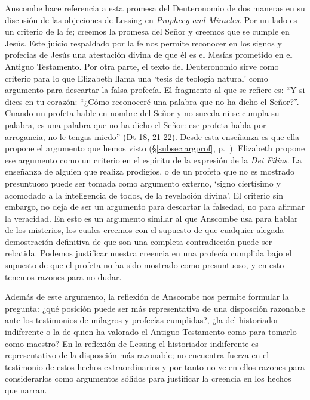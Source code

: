 Anscombe hace referencia a esta promesa del Deuteronomio de dos maneras en su discusión de las objeciones de Lessing en \emph{Prophecy and Miracles}. Por un lado es un criterio de la fe; creemos la promesa del Señor y creemos que se cumple en Jesús. Este juicio respaldado por la fe nos permite reconocer en los signos y profecias de Jesús una atestación divina de que él es el Mesías prometido en el Antiguo Testamento. Por otra parte, el texto del Deuteronomio sirve como criterio para lo que Elizabeth llama una `tesis de teología natural' como argumento para descartar la falsa profecía. El fragmento al que se refiere es: \enquote{Y si dices en tu corazón: ``¿Cómo reconoceré una palabra que no ha dicho el Señor?''. Cuando un profeta hable en nombre del Señor y no suceda ni se cumpla su palabra, es una palabra que no ha dicho el Señor: ese profeta habla por arrogancia, no le tengas miedo} (Dt 18, 21-22). Desde esta enseñanza es que ella propone el argumento que hemos visto (\S\ref{subsec:argprof}, p.~\pageref{subsec:argprof}).
Elizabeth propone ese argumento como un criterio en el espíritu de la expresión de la \emph{Dei Filius}. La enseñanza de alguien que realiza prodigios, o de un profeta que no es mostrado presuntuoso puede ser tomada como argumento externo, \enquote*{signo ciertísimo y acomodado a la inteligencia de todos, de la revelación divina}. El criterio sin embargo, no deja de ser un argumento para descartar la falsedad, no para afirmar la veracidad. En esto es un argumento similar al que Anscombe usa para hablar de los misterios, los cuales creemos con el supuesto de que cualquier alegada demostración definitiva de que son una completa contradicción puede ser rebatida. Podemos justificar nuestra creencia en una profecía cumplida bajo el supuesto de que el profeta no ha sido mostrado como presuntuoso, y en esto tenemos razones para no dudar.

Además de este argumento, la reflexión de Anscombe nos permite formular la pregunta: ¿qué posición puede ser más representativa de una disposción razonable ante los testimonios de milagros y profecías cumplidas?, ¿la del historiador indiferente o la de quien ha valorado el Antiguo Testamento como para tomarlo como maestro? En la reflexión de Lessing el historiador indiferente es representativo de la disposción más razonable; no encuentra fuerza en el testimonio de estos hechos extraordinarios y por tanto no ve en ellos razones para considerarlos como argumentos sólidos para justificar la creencia en los hechos que narran.

